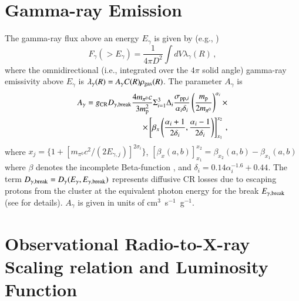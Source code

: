 \documentclass[useAMS,usenatbib]{mn2e}
\begin{document}
\begin{appendix}

\section{Gamma-ray Emission}
\label{app:C}

The gamma-ray flux above an energy $E_{\gamma}$ is given by (e.g.,
\citealp{2010MNRAS.409..449P})
%
\begin{equation}
F_{\gamma} (>E_{\gamma}) = \frac{1}{4\pi D^{2}} \int dV  \lambda_{\gamma}(R)\, ,
\end{equation}
%
where the omnidirectional (i.e., integrated over the $4\pi$ solid angle)
gamma-ray emissivity above $E_{\gamma}$ is $ \lambda_{\gamma}(R)=A_{\gamma} C(R)
\rho_{{\mathrm{gas}}}(R)$. The parameter $A_{\gamma}$ is \citep{2010MNRAS.409..449P}
%
\begin{eqnarray}
A_{\gamma} = g_{{\mathrm{CR}}} D_{\gamma,{\mathrm{break}}} \frac{4 m_{\pi^{0}} c}{3 m_{{\mathrm{p}}}^{2}} \Sigma_{i=1}^{3} \Delta_{i} \frac{\sigma_{{\mathrm{pp}},i}}{\alpha_{i} \delta_{i}} \left( \frac{m_{{\mathrm{p}}}}{2 m_{\pi^{0}}} \right)^{\alpha_{i}} \times \nonumber \\
\times \left[ \beta_{x} \left( \frac{\alpha_{i}+1}{2\delta_{i}}, \frac{\alpha_{i}-1}{2\delta_{i}} \right) \right]_{x_{1}}^{x_{2}} \, ,
\end{eqnarray}
%
where $x_{j}=\{ 1 + [ m_{\pi^{0}}c^2/(2E_{\gamma,j})]^{2\sigma_{i}} \}$, $\left[ \beta_{x}(a,b) \right]_{x_1}^{x_2} =
\beta_{x_2}(a,b)-\beta_{x_1}(a,b)$ where $\beta$ denotes the incomplete
Beta-function \citep{1965hmfw.book.....A}, and
$\delta_{i}=0.14\alpha_{i}^{-1.6}+0.44$. The term $D_{\gamma,
  {\mathrm{break}}}=D_{\gamma}(E_{\gamma},E_{\gamma,{\mathrm{break}}})$ represents
diffusive CR losses due to escaping protons from the cluster at the equivalent
photon energy for the break $E_{\gamma, {\mathrm{break}}}$ (see
\citealp{2010MNRAS.409..449P} for details). $A_{\gamma}$ is given in units of
cm$^3$~s$^{-1}$~g$^{-1}$.




\section{Observational Radio-to-X-ray Scaling relation and Luminosity Function}
\label{app:D}


\end{appendix}
\end{document}
